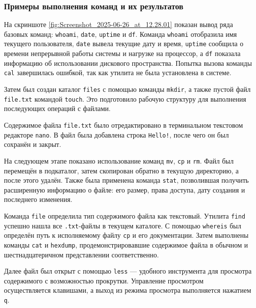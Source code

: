 \subsubsection{Примеры выполнения команд и их результатов}

На скриншоте \ref{fig:Screenshot_2025-06-26_at_12.28.01} показан вывод ряда базовых команд: \texttt{whoami}, \texttt{date}, \texttt{uptime} и \texttt{df}. Команда \texttt{whoami} отобразила имя текущего пользователя, \texttt{date} вывела текущие дату и время, \texttt{uptime} сообщила о времени непрерывной работы системы и нагрузке на процессор, а \texttt{df} показала информацию об использовании дискового пространства. Попытка вызова команды \texttt{cal} завершилась ошибкой, так как утилита не была установлена в системе.

Затем был создан каталог \texttt{files} с помощью команды \texttt{mkdir}, а также пустой файл \texttt{file.txt} командой \texttt{touch}. Это подготовило рабочую структуру для выполнения последующих операций с файлами.

Содержимое файла \texttt{file.txt} было отредактировано в терминальном текстовом редакторе \texttt{nano}. В файл была добавлена строка \texttt{Hello!}, после чего он был сохранён и закрыт.

На следующем этапе показано использование команд \texttt{mv}, \texttt{cp} и \texttt{rm}. Файл был перемещён в подкаталог, затем скопирован обратно в текущую директорию, а после этого удалён. Также была применена команда \texttt{stat}, позволившая получить расширенную информацию о файле: его размер, права доступа, дату создания и последнего изменения.

Команда \texttt{file} определила тип содержимого файла как текстовый. Утилита \texttt{find} успешно нашла все \texttt{.txt}-файлы в текущем каталоге. С помощью \texttt{whereis} был определён путь к исполняемому файлу \texttt{cp} и его документации. Затем выполнены команды \texttt{cat} и \texttt{hexdump}, продемонстрировавшие содержимое файла в обычном и шестнадцатеричном представлении соответственно.

Далее файл был открыт с помощью \texttt{less} — удобного инструмента для просмотра содержимого с возможностью прокрутки. Управление просмотром осуществляется клавишами, а выход из режима просмотра выполняется нажатием \texttt{q}.

